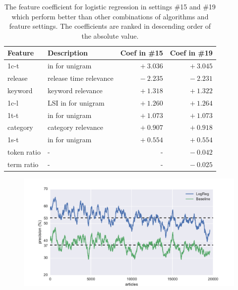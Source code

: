 \begin{table}[!hbt]
\centering
\begin{tabularx}{0.8\textwidth}{lXrr}
\textbf{Feature} & \textbf{Description}  & \textbf{Coef in \#15} & \textbf{Coef in \#19} \\ \hline
1c-t & \tfidf{} in \icontent{} for unigram     & $+~3.036$  & $+~3.045$     \\
release & release time relevance & $-~2.235$   &  $-~2.231$     \\
keyword & keyword relevance  & $+~1.318$  & $+~1.322$ \\
1c-l & LSI in \icontent{} for unigram     & $+~1.260$   & $+~1.264$    \\
1t-t & \tfidf{} in \ititle{} for unigram     & $+~1.073$   & $+~1.073$      \\
category & category relevance & $+~0.907$   & $+~0.918$     \\
1s-t & \tfidf{} in \isummary{} for unigram      & $+~0.554$   & $~+0.554$     \\ \hline
token ratio & - & - & $-~0.042$ \\ 
term ratio & - & - & $-~0.025$ \\ \hline
\end{tabularx}
\caption[The feature coefficients for logistic regression in settings \#15 and \#19 which perform better than other combinations of algorithms and feature settings]{The feature coefficient for logistic regression in settings \#15 and \#19 which perform better than other combinations of algorithms and feature settings. The coefficients are ranked in descending order of the absolute value. }
\label{tab:coef}
\end{table}


\begin{figure}[!htb]
    \centering
    \includegraphics[width=\textwidth]{fig/precision_inc_supervised}
    \caption[]{}
    \label{fig:prec_supervised}
\end{figure}